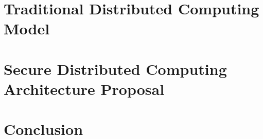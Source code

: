 \documentclass[oneside, english, draft]{sdqthesis}
\begin{document}






\chapter{Traditional Distributed Computing Model}


\chapter{Secure Distributed Computing Architecture Proposal}




\chapter{Conclusion}




\nocite{*}
\printbibliography[heading=bibintoc]

\appendix

\end{document}
